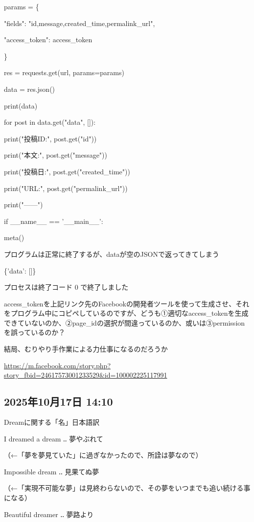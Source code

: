 \documentclass[facebook_diary.tex]{subfiles}
\begin{document}
params = \{

"fields": "id,message,created\_time,permalink\_url",

"access\_token": access\_token

\}

res = requests.get(url, params=params)

data = res.json()

print(data)

for post in data.get("data", []):

print("投稿ID:", post.get("id"))

print("本文:", post.get("message"))

print("投稿日:", post.get("created\_time"))

print("URL:", post.get("permalink\_url"))

print("------")


if \_\_name\_\_ == '\_\_main\_\_':

meta()


プログラムは正常に終了するが、dataが空のJSONで返ってきてしまう


\{'data': []\}

プロセスは終了コード 0 で終了しました


access\_tokenを上記リンク先のFacebookの開発者ツールを使って生成させ、それをプログラム中にコピペしているのですが、どうも①適切なaccess\_tokenを生成できていないのか、②page\_idの選択が間違っているのか、或いは③permissionを誤っているのか？


結局、むりやり手作業による力仕事になるのだろうか

\url{https://m.facebook.com/story.php?story_fbid=24617573001233529&id=100002225117991}



\subsection*{2025年10月17日 14:10}

Dreamに関する「名」日本語訳


I dreamed a dream ‥ 夢やぶれて

（←「夢を夢見ていた」に過ぎなかったので、所詮は夢なので）


Impossible dream ‥ 見果てぬ夢

（←「実現不可能な夢」は見終わらないので、その夢をいつまでも追い続ける事になる）


Beautiful dreamer ‥ 夢路より
\end{document}
